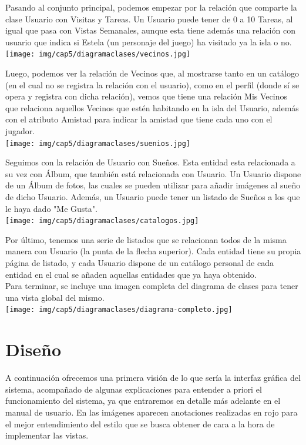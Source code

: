 	Pasando al conjunto principal, podemos empezar por la relación que comparte la clase Usuario con Visitas y Tareas. Un Usuario puede tener de 0 a 10 Tareas, al igual que pasa con Vistas Semanales, aunque esta tiene además una relación con usuario que indica si Estela (un personaje del juego) ha visitado ya la isla o no.\\
	
	\texttt{[image: img/cap5/diagramaclases/vecinos.jpg]}
	
	Luego, podemos ver la relación de Vecinos que, al mostrarse tanto en un catálogo (en el cual no se registra la relación con el usuario), como en el perfil (donde sí se opera y registra con dicha relación), vemos que tiene una relación Mis Vecinos que relaciona aquellos Vecinos que estén habitando en la isla del Usuario, además con el atributo Amistad para indicar la amistad que tiene cada uno con el jugador.\\
	
	\texttt{[image: img/cap5/diagramaclases/suenios.jpg]}
	
	Seguimos con la relación de Usuario con Sueños. Esta entidad esta relacionada a su vez con Álbum, que también está relacionada con Usuario. Un Usuario dispone de un Álbum de fotos, las cuales se pueden utilizar para añadir imágenes al sueño de dicho Usuario. Además, un Usuario puede tener un listado de Sueños a los que le haya dado "Me Gusta".\\ 
	
	\texttt{[image: img/cap5/diagramaclases/catalogos.jpg]}
	
	Por último, tenemos una serie de listados que se relacionan todos de la misma manera con Usuario (la punta de la flecha superior). Cada entidad tiene su propia página de listado, y cada Usuario dispone de un catálogo personal de cada entidad en el cual se añaden aquellas entidades que ya haya obtenido.\\
	
	Para terminar, se incluye una imagen completa del diagrama de clases para tener una vista global del mismo.\\
	
	\texttt{[image: img/cap5/diagramaclases/diagrama-completo.jpg]}
	
\clearpage

\section{Dise\~no}

A continuación ofrecemos una primera visión de lo que sería la interfaz gráfica del sistema, acompañado de algunas explicaciones para entender a priori el funcionamiento  del sistema, ya que entraremos en detalle más adelante en el manual de usuario. En las imágenes aparecen anotaciones realizadas en rojo para el mejor entendimiento del estilo que se busca obtener de cara a la hora de implementar las vistas.\\

